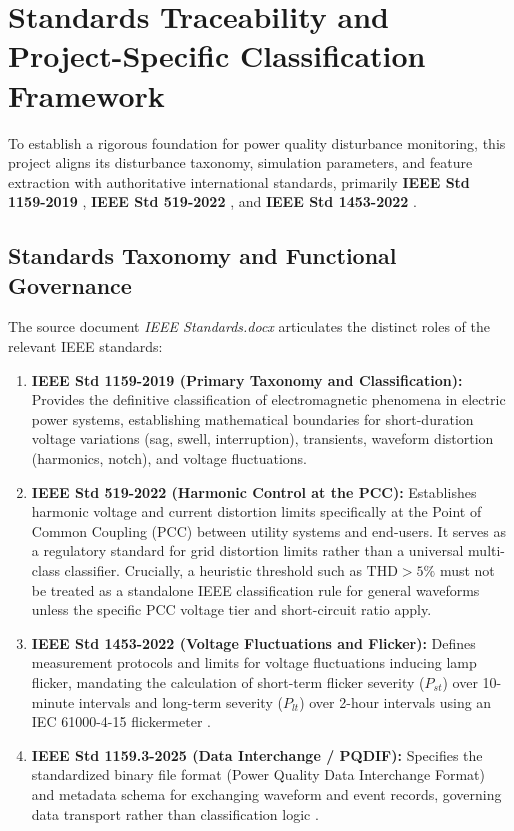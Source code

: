 \documentclass[12pt,a4paper]{report}
\begin{document}
\section{Standards Traceability and Project-Specific Classification Framework}
To establish a rigorous foundation for power quality disturbance monitoring, this project aligns its disturbance taxonomy, simulation parameters, and feature extraction with authoritative international standards, primarily \textbf{IEEE Std 1159-2019} \cite{ieee1159}, \textbf{IEEE Std 519-2022} \cite{ieee519}, and \textbf{IEEE Std 1453-2022} \cite{ieee1453}.

\subsection{Standards Taxonomy and Functional Governance}
The source document \textit{IEEE Standards.docx} articulates the distinct roles of the relevant IEEE standards:
\begin{enumerate}
    \item \textbf{IEEE Std 1159-2019 (Primary Taxonomy and Classification):} Provides the definitive classification of electromagnetic phenomena in electric power systems, establishing mathematical boundaries for short-duration voltage variations (sag, swell, interruption), transients, waveform distortion (harmonics, notch), and voltage fluctuations.
    \item \textbf{IEEE Std 519-2022 (Harmonic Control at the PCC):} Establishes harmonic voltage and current distortion limits specifically at the Point of Common Coupling (PCC) between utility systems and end-users. It serves as a regulatory standard for grid distortion limits rather than a universal multi-class classifier. Crucially, a heuristic threshold such as $\text{THD} > 5\%$ must not be treated as a standalone IEEE classification rule for general waveforms unless the specific PCC voltage tier and short-circuit ratio apply.
    \item \textbf{IEEE Std 1453-2022 (Voltage Fluctuations and Flicker):} Defines measurement protocols and limits for voltage fluctuations inducing lamp flicker, mandating the calculation of short-term flicker severity ($P_{st}$) over 10-minute intervals and long-term severity ($P_{lt}$) over 2-hour intervals using an IEC 61000-4-15 flickermeter \cite{iec61000}.
    \item \textbf{IEEE Std 1159.3-2025 (Data Interchange / PQDIF):} Specifies the standardized binary file format (Power Quality Data Interchange Format) and metadata schema for exchanging waveform and event records, governing data transport rather than classification logic \cite{ieee1159_3}.
\end{enumerate}
\end{document}
